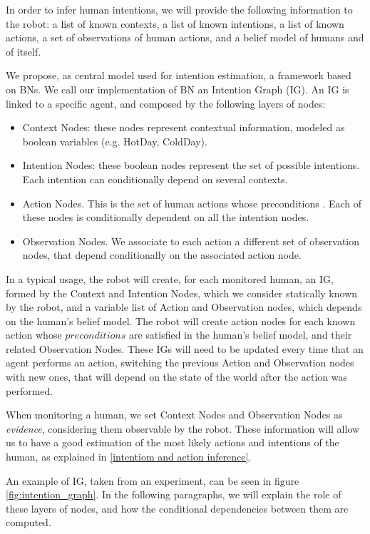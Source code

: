 In order to infer human intentions, we will provide the following information to the robot: a list of known contexts, a list of known intentions, a list of known actions, a set of observations of human actions, and a belief model of humans and of itself.

We propose, as central model used for intention estimation, a framework based on BNs. We call our implementation of BN an Intention Graph (IG).
An IG is linked to a specific agent, and composed by the following layers of nodes:
\begin{itemize}
\item Context Nodes: these nodes represent contextual information, modeled as boolean variables (e.g. HotDay, ColdDay).
\item Intention Nodes: these boolean nodes represent the set of possible intentions. Each intention can conditionally depend on several contexts.
\item Action Nodes. This is the set of human actions whose preconditions . Each of these nodes is conditionally dependent on all the intention nodes. 
\item Observation Nodes. We associate to each action a different set of observation nodes, that depend conditionally on the associated action node. 
\end{itemize}

In a typical usage, the robot will create, for each monitored human, an IG, formed by the Context and Intention Nodes, which we consider statically known by the robot, and a variable list of Action and Observation nodes, which depends on the human's belief model. The robot will create action nodes for each known action whose $preconditions$ are satisfied in the human's belief model, and their related Observation Nodes. These IGs will need to be updated every time that an agent performs an action, switching the previous Action and Observation nodes with new ones, that will depend on the state of the world after the action was performed.

When monitoring a human, we set Context Nodes and Observation Nodes as \textit{evidence}, considering them observable by the robot. These information will allow us to have a good estimation of the most likely actions and intentions of the human, as explained in \ref{intentiom and action inference}.

An example of IG, taken from an experiment, can be seen in figure \ref{fig:intention_graph}. In the following paragraphs, we will explain the role of these layers of nodes, and how the conditional dependencies between them are computed.
\vspace{-10pt}

